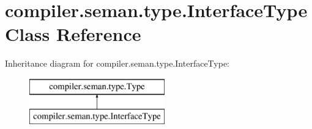 \hypertarget{classcompiler_1_1seman_1_1type_1_1_interface_type}{}\section{compiler.\+seman.\+type.\+Interface\+Type Class Reference}
\label{classcompiler_1_1seman_1_1type_1_1_interface_type}
Inheritance diagram for compiler.\+seman.\+type.\+Interface\+Type\+:\begin{figure}[H]
\begin{center}
\leavevmode
\includegraphics[height=2.000000cm]{classcompiler_1_1seman_1_1type_1_1_interface_type}
\end{center}
\end{figure}
